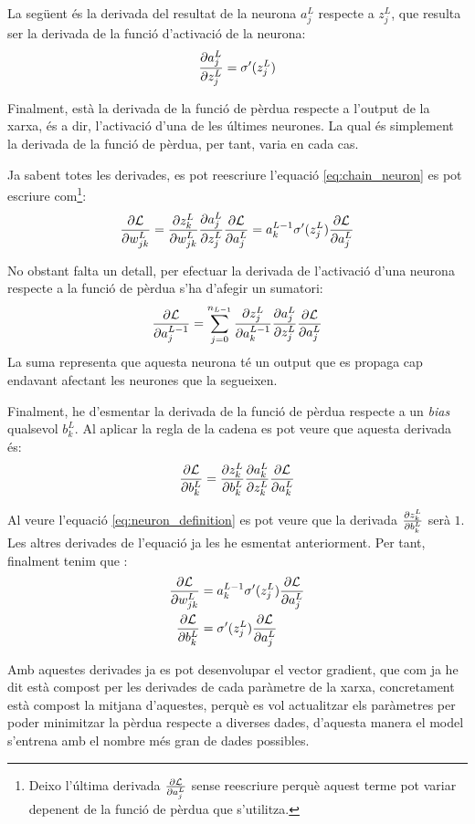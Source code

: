 La següent és la derivada del resultat de la neurona $a_j^L$ respecte a $z_j^L$, que resulta ser la derivada de la funció d'activació de la neurona:
\begin{equation*}
	\pdv{a_j^L}{z_j^L} = \sigma'(z_j^L)
\end{equation*}

Finalment, està la derivada de la funció de pèrdua respecte a l'output de la xarxa, és a dir, l'activació d'una de les últimes neurones. La qual és simplement la derivada de la funció de pèrdua, per tant, varia en cada cas.

Ja sabent totes les derivades, es pot reescriure l'equació \ref{eq:chain_neuron} es pot escriure com\footnote{Deixo l'última derivada $\pdv{\mathcal{L}}{a_j^L}$ sense reescriure perquè aquest terme pot variar depenent de la funció de pèrdua que s'utilitza.}:
$$
	\pdv{\mathcal{L}}{w_{jk}^L} = \pdv{z_k^L}{w_{jk}^L}\pdv{a_j^L}{z_j^L}\pdv{\mathcal{L}}{a_j^L} = 
	a^{L-1}_k \sigma'(z_j^L)\pdv{\mathcal{L}}{a_j^L}
$$

No obstant falta un detall, per efectuar la derivada de l'activació d'una neurona respecte a la funció de pèrdua s'ha d'afegir un sumatori:
$$
\pdv{\mathcal{L}}{a_j^{L-1}} = \sum_{j=0}^{n_{L-1}} \pdv{z_j^L}{a_k^{L-1}}\pdv{a_j^L}{z_j^L}\pdv{\mathcal{L}}{a_j^L}
$$
La suma representa que aquesta neurona té un output que es propaga cap endavant afectant les neurones que la segueixen.

Finalment, he d'esmentar la derivada de la funció de pèrdua respecte a un \textit{bias} qualsevol $ b^L_k$. Al aplicar la regla de la cadena es pot veure que aquesta derivada és:
\begin{equation*}
	\pdv{\mathcal{L}}{b^L_k} = \pdv{z^L_{k}}{b^L_{k}}\pdv{a^L_{k}}{z^L_{k}}\pdv{\mathcal{L}}{a^L_{k}}
\end{equation*}

Al veure l'equació \ref{eq:neuron_definition} es pot veure que la derivada $ \pdv{z^{L}_{k}}{b^{L}_{k}}$ serà $1$. Les altres derivades de l'equació ja les he esmentat anteriorment. Per tant, finalment tenim que \cite{3b1b}:
\begin{align*}
	\pdv{\mathcal{L}}{w_{jk}^L} &= a^{L-1}_k \sigma'(z_j^L)\pdv{\mathcal{L}}{a_j^L} \\
	\pdv{\mathcal{L}}{b^L_k} &= \sigma'(z_j^L)\pdv{\mathcal{L}}{a_j^L}
\end{align*}

Amb aquestes derivades ja es pot desenvolupar el vector gradient, que com ja he dit està compost per les derivades de cada paràmetre de la xarxa, concretament està compost la mitjana d'aquestes, perquè es vol actualitzar els paràmetres per poder minimitzar la pèrdua respecte a diverses dades, d'aquesta manera el model s'entrena amb el nombre més gran de dades possibles.

